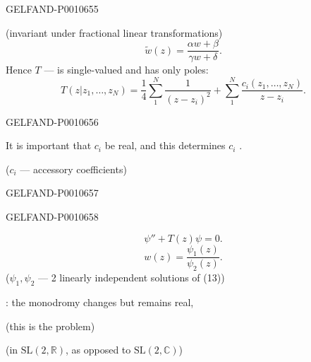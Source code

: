 \begin{GelfandAdjacentEvidence}{GELFAND-P001065}{5}

(invariant under fractional linear transformations)
\[
\widetilde w(z)=\frac{\alpha w+\beta}{\gamma w+\delta}.
\]
Hence \(T\) — is single-valued and has only poles:
\begin{equation*}
T(z|z_1,\ldots,z_N)=\frac14\sum_1^N\frac1{(z-z_i)^2}
 +\sum_1^N\frac{c_i(z_1,\ldots,z_N)}{z-z_i}.
\tag{11}
\end{equation*}
\end{GelfandAdjacentEvidence}
\begin{GelfandAdjacentEvidence}{GELFAND-P001065}{6}


It is important that \(c_i\) be real, and this determines \(c_i\) {}.

(\(c_i\) — accessory coefficients)
\end{GelfandAdjacentEvidence}
\begin{GelfandAdjacentEvidence}{GELFAND-P001065}{7}


\end{GelfandAdjacentEvidence}
\begin{GelfandAdjacentEvidence}{GELFAND-P001065}{8}

\begin{equation*}
\psi''+T(z)\psi=0.\tag{12}
\end{equation*}
\begin{equation*}
w(z)=\frac{\psi_1(z)}{\psi_2(z)}.\tag{13}
\end{equation*}
(\(\psi_1,\psi_2\) — 2 linearly independent solutions of (13))
\end{GelfandAdjacentEvidence}


: the monodromy changes but remains real,

(this is the problem)

(in \(\mathrm{SL}(2,\mathbb R)\), as opposed to \(\mathrm{SL}(2,\mathbb C)\))


